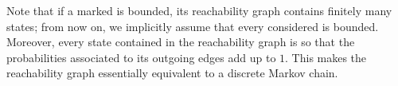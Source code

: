 Note that if a marked \uswn is bounded, its reachability graph contains finitely many states; from now on, we implicitly assume that every \uswn considered is bounded.
Moreover, every state contained in the reachability graph is so that the probabilities associated to its outgoing edges add up 
to $1$.
This makes the reachability graph essentially equivalent to a discrete Markov chain.








